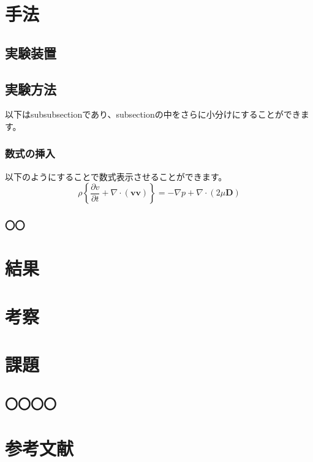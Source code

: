 \documentclass{jarticle}
\begin{document}
\newpage%

\section{手法}

\subsection{実験装置}
\subsection{実験方法}
以下はsubsubsectionであり、subsectionの中をさらに小分けにすることができます。
\subsubsection{数式の挿入}
以下のようにすることで数式表示させることができます。
$$
\rho\left\{\frac{\partial v}{\partial t}+\nabla \cdot(\boldsymbol{v} \boldsymbol{v})\right\}=-\nabla p+\nabla \cdot(2 \mu \boldsymbol{D})
$$

\subsubsection{〇〇}

\section{結果}

\section{考察}

\section{課題}
\subsection{〇〇〇〇}

\section{参考文献}
 
\end{document}
